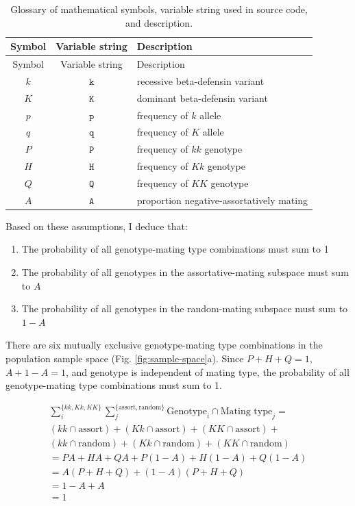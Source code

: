 \documentclass[
]{article}
\providecommand{\tightlist}{%
  \setlength{\itemsep}{0pt}\setlength{\parskip}{0pt}}
\begin{document}
\begin{longtable}[]{@{}ccl@{}}
\caption{\label{tab:symbols}Glossary of mathematical symbols, variable string used in source code, and description.}\tabularnewline
\toprule
Symbol & Variable string & Description \\
\midrule
\endfirsthead
\toprule
Symbol & Variable string & Description \\
\midrule
\endhead
\(k\) & \(\mathtt{k}\) & recessive beta-defensin variant \\
\(K\) & \(\mathtt{K}\) & dominant beta-defensin variant \\
\(p\) & \(\mathtt{p}\) & frequency of \(\textit{k}\) allele \\
\(q\) & \(\mathtt{q}\) & frequency of \(\textit{K}\) allele \\
\(P\) & \(\mathtt{P}\) & frequency of \(\textit{kk}\) genotype \\
\(H\) & \(\mathtt{H}\) & frequency of \(\textit{Kk}\) genotype \\
\(Q\) & \(\mathtt{Q}\) & frequency of \(\textit{KK}\) genotype \\
\(A\) & \(\mathtt{A}\) & proportion negative-assortatively mating \\
\bottomrule
\end{longtable}

Based on these assumptions, I deduce that:

\begin{enumerate}
\def\labelenumi{\arabic{enumi}.}
\tightlist
\item
  The probability of all genotype-mating type combinations must sum to 1
\item
  The probability of all genotypes in the assortative-mating subspace must sum to \(A\)
\item
  The probability of all genotypes in the random-mating subspace must sum to \(1-A\)
\end{enumerate}

There are six mutually exclusive genotype-mating type combinations in the population sample space (Fig. \ref{fig:sample-space}a). Since \(P+H+Q=1\), \(A + 1 - A = 1\), and genotype is independent of mating type, the probability of all genotype-mating type combinations must sum to 1.

\begin{multline*}
 \sum_i^{\{\mathit{kk}, \mathit{Kk}, \mathit{KK}\}} \sum_j^{\{\textrm{assort}, \textrm{random}\}} \textrm{Genotype}_i \cap \textrm{Mating~type}_j = \\  
  (\mathit{kk} \cap \textrm{assort}) + (\mathit{Kk} \cap \textrm{assort}) + 
  (\mathit{KK} \cap \textrm{assort}) + \\ (\mathit{kk} \cap \textrm{random}) + 
  (\mathit{Kk} \cap \textrm{random}) + (\mathit{KK} \cap \textrm{random}) \\
 = PA + HA + QA + P (1 - A) + H (1 - A) + Q (1 - A) \\
 = A (P + H + Q) + (1 - A) (P + H + Q) \\
 = 1 - A + A \\
 = 1 \\
\end{multline*}
\end{document}
